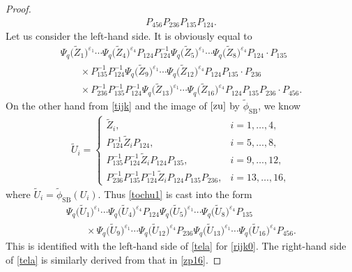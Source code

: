 \documentclass[pdftex]{sigma}
\numberwithin{equation}{section}
\begin{document}
\begin{proof}
\begin{gather}
P_{456}P_{236}P_{135}P_{124}.\label{zp16}
\end{gather}
Let us consider the left-hand side.
It is obviously equal to
\begin{gather}
\Psi_q\bigl(\tilde{Z}_1\bigr)^{\varepsilon_1}\dotsm \Psi_q\bigl({\tilde Z}_{4}\bigr)^{\varepsilon_4}
P_{124}
P^{-1}_{124}
\Psi_q\bigl(\tilde{Z}_5\bigr)^{\varepsilon_1}\dotsm \Psi_q\bigl({\tilde Z}_{8}\bigr)^{\varepsilon_4}
P_{124} \cdot P_{135}\nonumber
\\
\qquad \times
P^{-1}_{135} P^{-1}_{124}
\Psi_q\bigl(\tilde{Z}_9\bigr)^{\varepsilon_1}\dotsm \Psi_q\bigl({\tilde Z}_{12}\bigr)^{\varepsilon_4}
P_{124} P_{135} \cdot P_{236}\nonumber
\\
\qquad \times
P^{-1}_{236} P^{-1}_{135} P^{-1}_{124}
\Psi_q\bigl(\tilde{Z}_{13}\bigr)^{\varepsilon_1}\dotsm \Psi_q\bigl({\tilde Z}_{16}\bigr)^{\varepsilon_4}
P_{124} P_{135} P_{236} \cdot P_{456}.\label{tochu1}
\end{gather}
On the other hand from \eqref{tijk} and the image of $\eqref{zu}$ by $\tilde{\phi}_\mathrm{SB}$, we know
\begin{align*}
{\tilde U}_i = \begin{cases}
\tilde{Z}_i, & i=1,\dotsc, 4,
\\
P_{124}^{-1} \tilde{Z}_i P_{124}, & i=5,\dotsc, 8,
\\
P_{135}^{-1}P_{124}^{-1} \tilde{Z}_i P_{124}P_{135}, & i=9,\dotsc, 12,
\\
P_{236}^{-1}P_{135}^{-1}P_{124}^{-1} \tilde{Z}_i
P_{124}P_{135} P_{236}, & i=13,\dotsc, 16,
\end{cases}
\end{align*}
where $\tilde{U}_i = \tilde{\phi}_\mathrm{SB}(U_i)$.
Thus \eqref{tochu1} is cast into the form
\begin{gather*}
\Psi_q\bigl(\tilde{U}_1\bigr)^{\varepsilon_1}\cdots \Psi_q\bigl({\tilde U}_{4}\bigr)^{\varepsilon_4}
P_{124}
\Psi_q\bigl(\tilde{U}_5\bigr)^{\varepsilon_1}\cdots \Psi_q\bigl({\tilde U}_{8}\bigr)^{\varepsilon_4}
P_{135}
\\
\qquad\times
\Psi_q\bigl(\tilde{U}_9\bigr)^{\varepsilon_1}\cdots \Psi_q\bigl({\tilde U}_{12}\bigr)^{\varepsilon_4}
P_{236}
\Psi_q\bigl(\tilde{U}_{13}\bigr)^{\varepsilon_1}\cdots \Psi_q\bigl({\tilde U}_{16}\bigr)^{\varepsilon_4}
P_{456}.
\end{gather*}
This is identified with the left-hand side of \eqref{tela} for \eqref{rijk0}.
The right-hand side of \eqref{tela} is similarly derived from that in \eqref{zp16}.
\end{proof}
\end{document}
